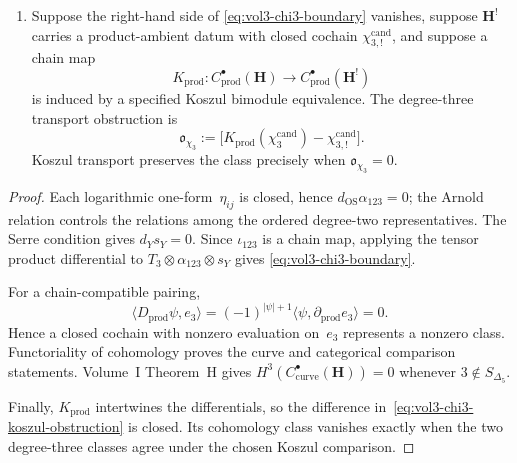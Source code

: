 \begin{theorem}
\begin{enumerate}[label=\textup{(\roman*)}]
satisfies
\[
 \chi_{\Phi_3}(\omega_{K3\times E})-
 \chi_3^{\mathrm{cand}}=D_{\mathrm{prod}}h.
\]
\item Suppose the right-hand side of
\eqref{eq:vol3-chi3-boundary} vanishes, suppose $\mathbf H^!$ carries
a product-ambient datum with closed cochain
$\chi_{3,!}^{\mathrm{cand}}$, and suppose a chain map
\[
 K_{\mathrm{prod}}\colon C^\bullet_{\mathrm{prod}}(\mathbf H)
 \longrightarrow C^\bullet_{\mathrm{prod}}(\mathbf H^!)
\]
is induced by a specified Koszul bimodule equivalence.  The
degree-three transport obstruction is
\begin{equation}
\label{eq:vol3-chi3-koszul-obstruction}
 \mathfrak o_{\chi_3}
 :=\bigl[K_{\mathrm{prod}}(\chi_3^{\mathrm{cand}})
          -\chi_{3,!}^{\mathrm{cand}}\bigr].
\end{equation}
Koszul transport preserves the class precisely when
$\mathfrak o_{\chi_3}=0$.
\end{enumerate}

\begin{proof}
Each logarithmic one-form~$\eta_{ij}$ is closed, hence
$d_{\mathrm{OS}}\alpha_{123}=0$; the Arnold relation controls the
relations among the ordered degree-two representatives.  The Serre
condition gives $d_Ys_Y=0$.  Since $\iota_{123}$ is a chain map,
applying the tensor
product differential to
$T_3\otimes\alpha_{123}\otimes s_Y$ gives
\eqref{eq:vol3-chi3-boundary}.

For a chain-compatible pairing,
\[
 \langle D_{\mathrm{prod}}\psi,e_3\rangle
 =(-1)^{|\psi|+1}
 \langle\psi,\partial_{\mathrm{prod}}e_3\rangle=0.
\]
Hence a closed cochain with nonzero evaluation on~$e_3$ represents a
nonzero class.  Functoriality of cohomology proves the curve and
categorical comparison statements.  Volume~I Theorem~H gives
$H^3(C^\bullet_{\mathrm{curve}}(\mathbf H))=0$ whenever
$3\notin S_{\Delta_5}$.

Finally, $K_{\mathrm{prod}}$ intertwines the differentials, so the
difference in~\eqref{eq:vol3-chi3-koszul-obstruction} is closed.  Its
cohomology class vanishes exactly when the two degree-three classes
agree under the chosen Koszul comparison.
\end{proof}
\end{theorem}

